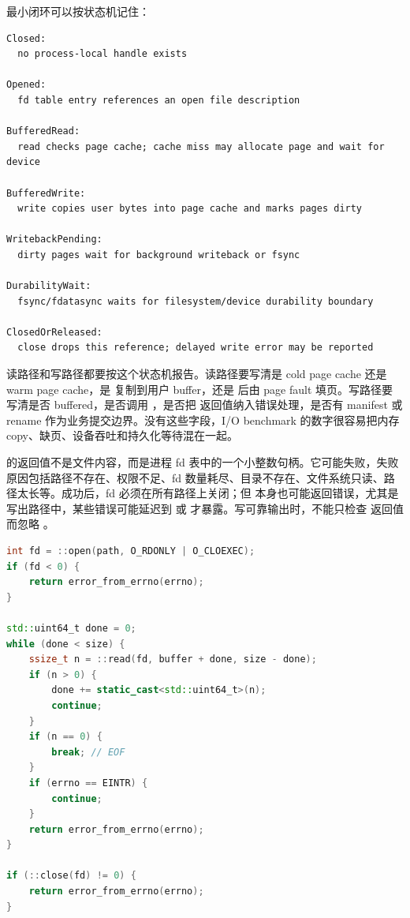 最小闭环可以按状态机记住：

\begin{lstlisting}[numbers=none,caption={fd 和普通文件数据路径状态机}]
Closed:
  no process-local handle exists

Opened:
  fd table entry references an open file description

BufferedRead:
  read checks page cache; cache miss may allocate page and wait for device

BufferedWrite:
  write copies user bytes into page cache and marks pages dirty

WritebackPending:
  dirty pages wait for background writeback or fsync

DurabilityWait:
  fsync/fdatasync waits for filesystem/device durability boundary

ClosedOrReleased:
  close drops this reference; delayed write error may be reported
\end{lstlisting}

读路径和写路径都要按这个状态机报告。读路径要写清是 cold page cache 还是 warm page cache，是  复制到用户 buffer，还是  后由 page fault 填页。写路径要写清是否 buffered，是否调用 ，是否把  返回值纳入错误处理，是否有 manifest 或 rename 作为业务提交边界。没有这些字段，I/O benchmark 的数字很容易把内存 copy、缺页、设备吞吐和持久化等待混在一起。

 的返回值不是文件内容，而是进程 fd 表中的一个小整数句柄。它可能失败，失败原因包括路径不存在、权限不足、fd 数量耗尽、目录不存在、文件系统只读、路径太长等。成功后，fd 必须在所有路径上关闭；但  本身也可能返回错误，尤其是写出路径中，某些错误可能延迟到  或  才暴露。写可靠输出时，不能只检查  返回值而忽略 。

\begin{lstlisting}[language=C++,caption={同步文件读取的基础合同，不是高性能版本}]
int fd = ::open(path, O_RDONLY | O_CLOEXEC);
if (fd < 0) {
    return error_from_errno(errno);
}

std::uint64_t done = 0;
while (done < size) {
    ssize_t n = ::read(fd, buffer + done, size - done);
    if (n > 0) {
        done += static_cast<std::uint64_t>(n);
        continue;
    }
    if (n == 0) {
        break; // EOF
    }
    if (errno == EINTR) {
        continue;
    }
    return error_from_errno(errno);
}

if (::close(fd) != 0) {
    return error_from_errno(errno);
}
\end{lstlisting}

